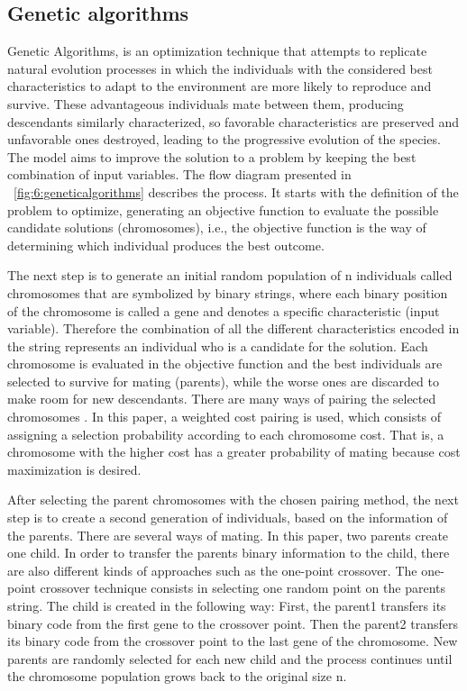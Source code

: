 \subsection{Genetic algorithms}

Genetic Algorithms, is an optimization technique that attempts to replicate natural evolution 
processes in which the individuals with the considered best characteristics to adapt to the 
environment are more likely to reproduce and survive. These advantageous individuals mate between 
them, producing descendants similarly characterized, so favorable characteristics are preserved and 
unfavorable ones destroyed, leading to the progressive evolution of the species. The model aims 
to improve the solution to a problem by keeping the best combination of input variables. The 
flow diagram presented in \figurename{~\ref{fig:6:geneticalgorithms}} describes the process. It 
starts with the definition of the problem to optimize, generating an objective function to evaluate 
the possible candidate solutions (chromosomes), i.e., the objective function is the way of 
determining which individual produces the best outcome. 

The next step is to generate an initial random population of n individuals called chromosomes that 
are symbolized by binary strings, where each binary position of the chromosome is called a gene and 
denotes a specific characteristic (input variable). Therefore the combination of all the different 
characteristics encoded in the string represents an individual who is a candidate for the solution.
Each chromosome is evaluated in the objective function and the best individuals are selected to 
survive for mating (parents), while the worse ones are discarded to make room for new descendants.  
There are many ways of pairing the selected chromosomes \citep{Haupt2004}. In this paper, a weighted 
cost pairing is used, which consists of assigning a selection probability according to each 
chromosome cost. That is, a chromosome with the higher cost has a greater probability of mating 
because cost maximization is desired.

After selecting the parent chromosomes with the chosen pairing method, the next step is to create a 
second generation of individuals, based on the information of the parents. There are several ways of 
mating. In this paper, two parents create one child. 
In order to transfer the parents binary information to the child, there are also different kinds 
of approaches such as the one-point crossover. The one-point crossover technique consists in 
selecting one random point on the parents string. The child is created in the following way: First, 
the parent1 transfers its binary code from the first gene to the crossover point. Then the parent2 
transfers its binary code from the crossover point to the last gene of the chromosome. New parents 
are randomly selected for each new child and the process continues until the chromosome population 
grows back to the original size n. 

